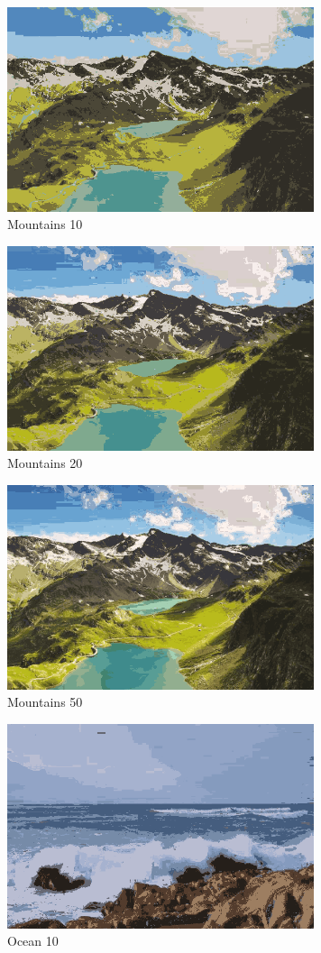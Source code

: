 \documentclass{article}
\begin{document}
\begin{figure}[ht!]
	\centering
	\caption{Mountains 10}
	\includegraphics[width=90mm]{mountains-em-k10-24.png}
\end{figure}

\begin{figure}[ht!]
	\centering
	\caption{Mountains 20}
	\includegraphics[width=90mm]{mountains-em-k20-44.png}
\end{figure}

\begin{figure}[ht!]
	\centering
	\caption{Mountains 50}
	\includegraphics[width=90mm]{mountains-em-k50-21.png}
\end{figure}


\begin{figure}[ht!]
	\centering
	\caption{Ocean 10}
	\includegraphics[width=90mm]{ocean-em-k10-29.png}
\end{figure}
\end{document}
